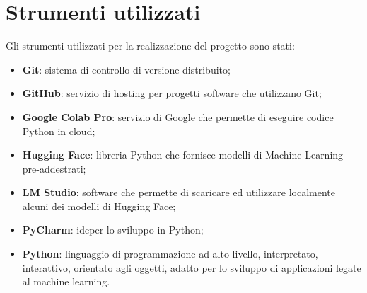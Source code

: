 \section{Strumenti utilizzati}
Gli strumenti utilizzati per la realizzazione del progetto sono stati:
\begin{itemize}
    \item \textbf{Git}: sistema di controllo di versione distribuito;
    \item \textbf{GitHub}: servizio di hosting per progetti software che utilizzano Git;
    \item \textbf{Google Colab Pro}: servizio di Google che permette di eseguire codice Python in cloud;
    \item \textbf{Hugging Face}: libreria Python che fornisce modelli di Machine Learning pre-addestrati;
    \item \textbf{LM Studio}: software che permette di scaricare ed utilizzare localmente alcuni dei modelli di Hugging Face;
    \item \textbf{PyCharm}: \gls{ide}\glox per lo sviluppo in Python;
    \item \textbf{Python}: linguaggio di programmazione ad alto livello, interpretato, interattivo, orientato agli oggetti, adatto per lo sviluppo di applicazioni legate al machine learning.
\end{itemize}

\newpage